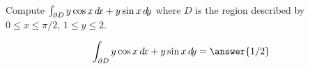 \documentclass{ximera}
\author{David Guichard \and Neal Koblitz \and H. Jerome Keisler \and Albert Scheller \and Barry Balof \and Mike Wills \and Matthew Carr}
\begin{document}
\begin{exercise}




Compute $\int_{\partial D}y\cos x\mathop{}\!d\! x+y\sin x\mathop{}\!d\! y$ where $D$ is the region described by $0\le x\le \pi/2$, $1\le y\le 2$. 
 

\begin{prompt}
\[
\int_{\partial D}y\cos x\d x+y\sin x\d y=\answer{1/2}
\]
\end{prompt}

\end{exercise}
\end{document}
